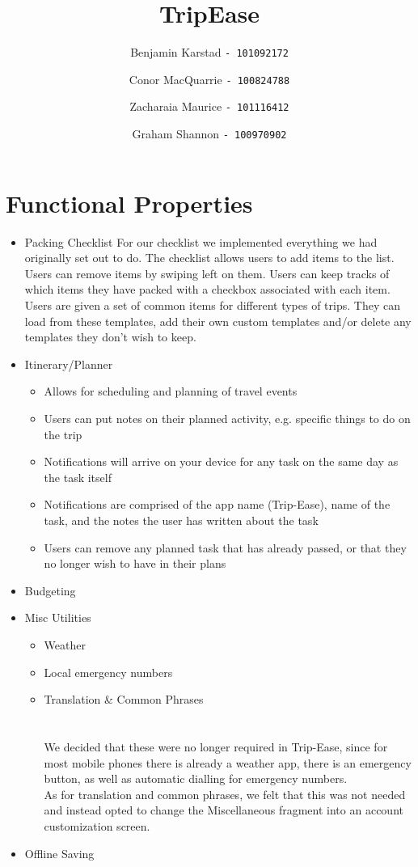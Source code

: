 \documentclass[12pt]{article}
\title{TripEase}
\author{
Benjamin Karstad
\texttt{- 101092172}
\and
Conor MacQuarrie
\texttt{- 100824788}
\and
Zacharaia Maurice
\texttt{- 101116412}
\and
Graham Shannon
\texttt{- 100970902}
}
\begin{document}
	\maketitle

	\section*{Functional Properties}

	\begin{itemize}

		\item{Packing Checklist}
		For our checklist we implemented everything we had originally set out to do.
		The checklist allows users to add items to the list. Users can remove items by swiping left on them.
		Users can keep tracks of which items they have packed with a checkbox associated with each item. Users are given a set of common items for different types of trips.
		They can load from these templates, add their own custom templates and/or delete any templates they don't wish to keep.

		\item{Itinerary/Planner}
			\begin{itemize}
				\item Allows for scheduling and planning of travel events
				\item Users can put notes on their planned activity, e.g. specific things to do on the trip
				\item Notifications will arrive on your device for any task on the same day as the task itself
				\item Notifications are comprised of the app name (Trip-Ease), name of the task, and the notes the user has written about the task
				\item Users can remove any planned task that has already passed, or that they no longer wish to have in their plans
			\end{itemize}
		\item{Budgeting}

		\item{Misc Utilities}

		\begin{itemize}
			\item Weather
			\item Local emergency numbers
			\item Translation \& Common Phrases
			\\
			\\
			\\
			We decided that these were no longer required in Trip-Ease, since for most mobile phones there is already a weather app, there is an emergency button, as well as automatic dialling for emergency numbers.\\
			As for translation and common phrases, we felt that this was not needed and instead opted to change the Miscellaneous fragment into an account customization screen.
		\end{itemize}

		\item{Offline Saving}

	\end{itemize}
\end{document}
